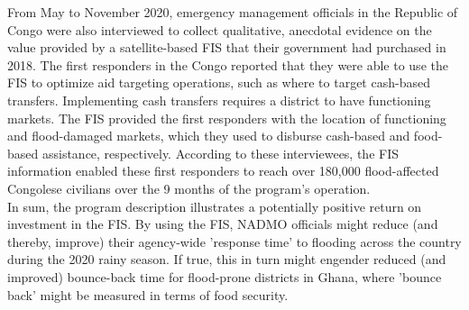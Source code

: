 From May to November 2020, emergency management officials in the Republic of Congo were also interviewed to collect qualitative, anecdotal evidence on the value provided by a satellite-based FIS that their government had purchased in 2018. The first responders in the Congo reported that they were able to use the FIS to optimize aid targeting operations, such as where to target cash-based transfers. Implementing cash transfers requires a district to have functioning markets. The FIS provided the first responders with the location of functioning and flood-damaged markets, which they used to disburse cash-based and food-based assistance, respectively. According to these interviewees, the FIS information enabled these first responders to reach over 180,000 flood-affected Congolese civilians over the 9 months of the program’s operation.\\

In sum, the program description illustrates a potentially positive return on investment in the FIS. By using the FIS, NADMO officials might reduce (and thereby, improve) their agency-wide 'response time' to flooding across the country during the 2020 rainy season. If true, this in turn might engender reduced (and improved) bounce-back time for flood-prone districts in Ghana, where 'bounce back' might be measured in terms of food security.







